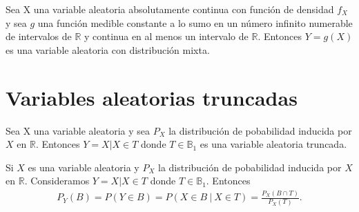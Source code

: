 \begin{prop}
Sea X una variable aleatoria absolutamente continua con función de densidad $f_X$ y sea $g$ una función medible constante a lo sumo en un número infinito numerable de intervalos de $\mathbb{R}$ y continua en al menos un intervalo de $\mathbb{R}$. Entonces $Y = g(X)$ es una variable aleatoria con distribución mixta.
\end{prop}

\section{Variables aleatorias truncadas}

\begin{defi}
Sea X una variable aleatoria y sea $P_X$ la distribución de pobabilidad inducida por $X$ en $\mathbb{R}$. Entonces $Y = X | X \in T$ donde $T \in \mathbb{B}_1$ es una variable aleatoria truncada.
\end{defi}

\begin{obs}
Si $X$ es una variable aleatoria y $P_X$ la distribución de pobabilidad inducida por $X$ en $\mathbb{R}$. Consideramos $Y = X | X \in T$ donde $T \in \mathbb{B}_1$. Entonces
\begin{align*}
    P_Y(B) = P(Y \in B) = P(X \in B \ | \ X \in T) = \frac{P_X(B \cap T)}{P_X(T)}.
\end{align*}
\end{obs}

